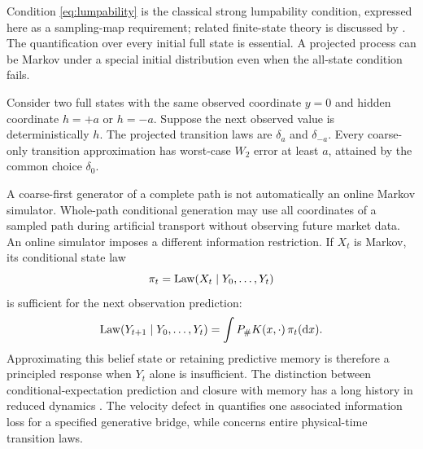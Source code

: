 Condition \eqref{eq:lumpability} is the classical strong lumpability condition, expressed here as a sampling-map requirement; related finite-state theory is discussed by \citet{geiger2014}. The quantification over every initial full state is essential. A projected process can be Markov under a special initial distribution even when the all-state condition fails.

\begin{example}
Consider two full states with the same observed coordinate $y=0$ and hidden coordinate $h=+a$ or $h=-a$. Suppose the next observed value is deterministically $h$. The projected transition laws are $\delta_a$ and $\delta_{-a}$. Every coarse-only transition approximation has worst-case $W_2$ error at least $a$, attained by the common choice $\delta_0$.
\end{example}

A coarse-first generator of a complete path is not automatically an online Markov simulator. Whole-path conditional generation may use all coordinates of a sampled path during artificial transport without observing future market data. An online simulator imposes a different information restriction. If $X_t$ is Markov, its conditional state law
\begin{equation}
 \pi_t=\operatorname{Law}(X_t\mid Y_0,\ldots,Y_t)
\end{equation}
is sufficient for the next observation prediction:
\begin{equation}\label{eq:filter-prediction}
 \operatorname{Law}(Y_{t+1}\mid Y_0,\ldots,Y_t)
 =\int P_{\#} K(x,\cdot)\,\pi_t(\mathrm dx).
\end{equation}
Approximating this belief state or retaining predictive memory is therefore a principled response when $Y_t$ alone is insufficient. The distinction between conditional-expectation prediction and closure with memory has a long history in reduced dynamics \citep{chorin2002}. The velocity defect in  quantifies one associated information loss for a specified generative bridge, while  concerns entire physical-time transition laws.
